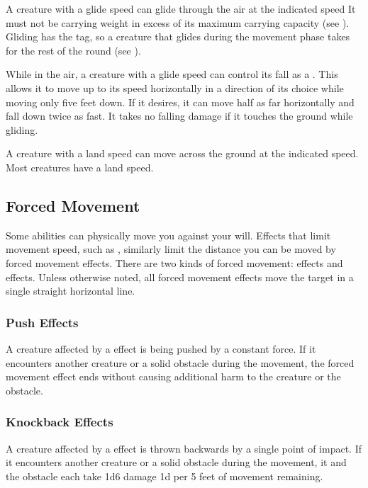         \label{Gliding}
        A creature with a glide speed can glide through the air at the indicated speed
        It must not be carrying weight in excess of its maximum carrying capacity (see ).
        Gliding has the  tag, so a creature that glides during the movement phase takes  for the rest of the round (see ).

        While in the air, a creature with a glide speed can control its fall as a . This allows it to move up to its speed horizontally in a direction of its choice while moving only five feet down. If it desires, it can move half as far horizontally and fall down twice as fast. It takes no falling damage if it touches the ground while gliding.

        A creature with a land speed can move across the ground at the indicated speed.
        Most creatures have a land speed.

    \subsection{Forced Movement}\label{Forced Movement}
        Some abilities can physically move you against your will.
        Effects that limit movement speed, such as , similarly limit the distance you can be moved by forced movement effects.
        There are two kinds of forced movement:  effects and  effects.
        Unless otherwise noted, all forced movement effects move the target in a single straight horizontal line.

        \subsubsection{Push Effects}\label{Push Effects}
            A creature affected by a  effect is being pushed by a constant force.
            If it encounters another creature or a solid obstacle during the movement, the forced movement effect ends without causing additional harm to the creature or the obstacle.

        \subsubsection{Knockback Effects}\label{Knockback Effects}
            A creature affected by a  effect is thrown backwards by a single point of impact.
            If it encounters another creature or a solid obstacle during the movement, it and the obstacle each take 1d6 damage \add 1d per 5 feet of movement remaining.

